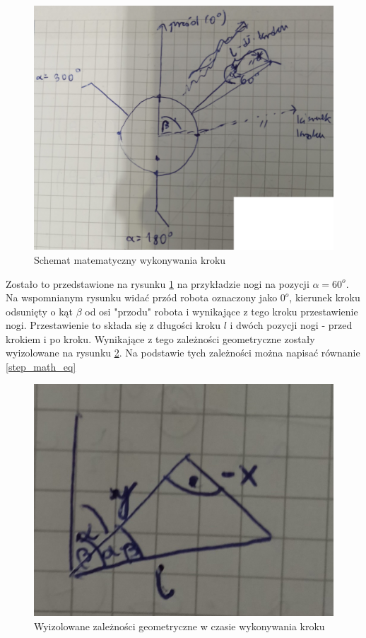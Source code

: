 \begin{figure}[h!]
\includegraphics[width=\textwidth]{img/step_math.jpg}
\caption{Schemat matematyczny wykonywania kroku}
\label{step_math}
\end{figure}

Zostało to przedstawione na rysunku \ref{step_math} na przykładzie nogi na pozycji $\alpha = 60^o$. Na wspomnianym rysunku widać przód robota oznaczony jako $0^o$, kierunek kroku odsunięty o kąt $\beta$ od osi "przodu" robota i wynikające z tego kroku przestawienie nogi. Przestawienie to składa się z długości kroku $l$ i dwóch pozycji nogi - przed krokiem i po kroku. Wynikające z tego zależności geometryczne zostały wyizolowane na rysunku \ref{step_math_isolated}. Na podstawie tych zależności można napisać równanie \ref{step_math_eq}

\begin{figure}[h!]
\includegraphics[width=\textwidth]{img/step_math_isolated.jpg}
\caption{Wyizolowane zależności geometryczne w czasie wykonywania kroku}
\label{step_math_isolated}
\end{figure}



